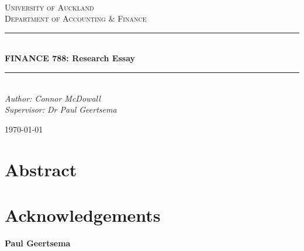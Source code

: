 \documentclass[10pt]{article}
\begin{document}
\begin{titlepage}
	\newcommand{\HRule}{\rule{\linewidth}{0.5mm}} %
	
	\center
	
	
	\textsc{\LARGE }\\[1.5cm] %
	
	\textsc{\Large University of Auckland\\Department of Accounting \& Finance}\\[0.5cm] %
	
	
	\HRule\\[0.5cm]
	
	{\huge\bfseries FINANCE 788: Research Essay}\\[0.4cm] %
	
	\HRule\\[0.5cm]
	
	
	{\large\textit{Author: Connor McDowall \\Supervisor: Dr Paul Geertsema}}\\
	
	
	\vfill\vfill\vfill %
	
	{\large\today} %
	 
	
	\vfill %
	
\end{titlepage}
\newpage
\section*{Abstract}
\newpage
\section*{Acknowledgements}
\begin{center}
	\textbf{Paul Geertsema}
\end{center}
\newpage
\end{document}
